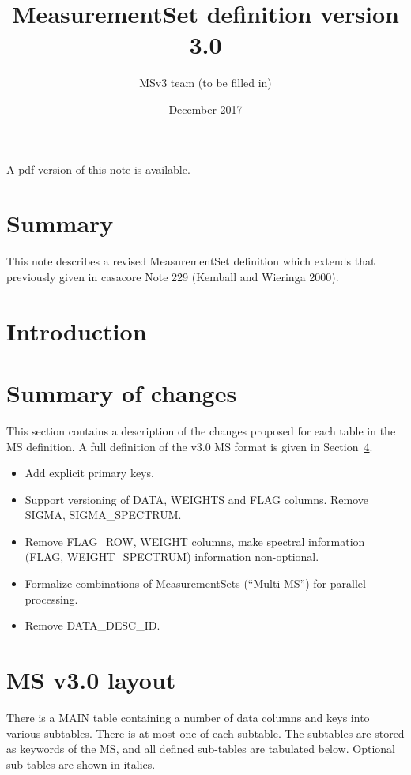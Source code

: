 \documentclass{article}
\begin{document}
\title{MeasurementSet definition version 3.0}
\author{MSv3 team (to be filled in)}
\date{December 2017}
\maketitle

\ifpdf
\else
\href{264.pdf}{A pdf version of this note is available.}
\fi

\tableofcontents 
\section{Summary} 

This note describes a revised MeasurementSet definition which extends
that previously given in casacore Note 229 (Kemball and Wieringa 2000).

\section{Introduction}

\section{Summary of changes}

This section contains a description of the changes proposed for each
table in the MS definition. A full definition of the v3.0 MS format is
given in Section~\ref{sec:layout}.

\begin{itemize}
\item Add explicit primary keys.
\item Support versioning of DATA, WEIGHTS and FLAG columns. Remove SIGMA, SIGMA\_SPECTRUM.
\item Remove FLAG\_ROW, WEIGHT columns, make spectral information (FLAG, WEIGHT\_SPECTRUM) information non-optional.
\item Formalize combinations of MeasurementSets (``Multi-MS'') for parallel processing.
\item Remove DATA\_DESC\_ID.
\end{itemize}

\newpage
\section{MS v3.0 layout}\label{sec:layout}

There is a MAIN table containing a number of data columns and keys
into various subtables. There is at most one of each subtable. The
subtables are stored as keywords of the MS, and all defined sub-tables
are tabulated below.  Optional sub-tables are shown in italics.
\end{document}

